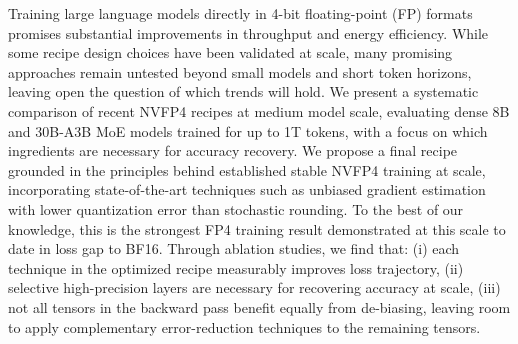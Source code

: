 Training large language models directly in 4-bit floating-point (FP) formats promises substantial improvements in throughput and energy efficiency. While some recipe design choices have been validated at scale, many promising approaches remain untested beyond small models and short token horizons, leaving open the question of which trends will hold. We present a systematic comparison of recent NVFP4 recipes at medium model scale, evaluating dense 8B and 30B-A3B MoE models trained for up to 1T tokens, with a focus on which ingredients are necessary for accuracy recovery. We propose a final recipe grounded in the principles behind established stable NVFP4 training at scale, incorporating state-of-the-art techniques such as unbiased gradient estimation with lower quantization error than stochastic rounding. To the best of our knowledge, this is the strongest FP4 training result demonstrated at this scale to date in loss gap to BF16. Through ablation studies, we find that: (i) each technique in the optimized recipe measurably improves loss trajectory, (ii) selective high-precision layers are necessary for recovering accuracy at scale, (iii) not all tensors in the backward pass benefit equally from de-biasing, leaving room to apply complementary error-reduction techniques to the remaining tensors.  
